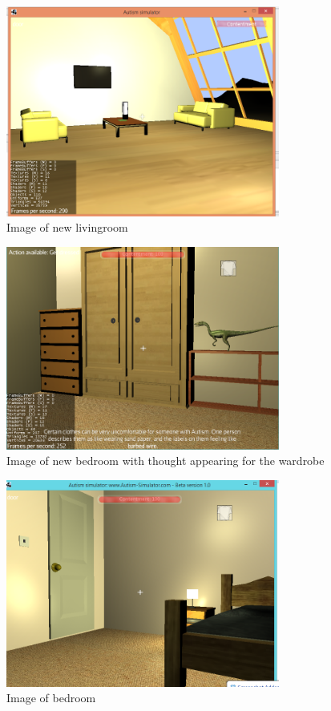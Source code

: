 \documentclass[11pt]{report}
\begin{document}
\begin{figure}[H]
\centering
\includegraphics[width=90mm]{images/new_livingroom.png}
\caption{Image of new livingroom}
\label{old_house}
\end{figure}

\begin{figure}[H]
\centering
\includegraphics[width=90mm]{images/implementationfirst/gameimages/bedroom.png}
\caption{Image of new bedroom with thought appearing for the wardrobe}
\label{old_house}
\end{figure}

\begin{figure}[H]
\centering
\includegraphics[width=90mm]{images/implementationfirst/gameimages/bedroom2.png}
\caption{Image of bedroom}
\label{old_house}
\end{figure}
\end{document}

